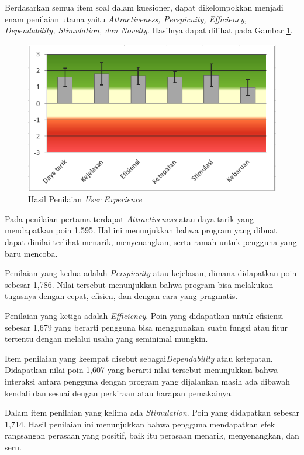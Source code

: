 Berdasarkan semua item soal dalam kuesioner, dapat dikelompokkan menjadi enam penilaian utama yaitu \emph{Attractiveness, Perspicuity, Efficiency, Dependability, Stimulation, dan Novelty}. Hasilnya dapat dilihat pada Gambar \ref{fig:Hasil Penilaian User Experience}. 

\begin{figure}[!htb]
  \centering
  \includegraphics[scale=1.1]{gambar/pengujian-user-experience/hasil-tiap-penilaian.png}
  \caption{Hasil Penilaian \emph{User Experience}}
  \label{fig:Hasil Penilaian User Experience}
\end{figure}

Pada penilaian pertama terdapat \emph{Attractiveness} atau daya tarik yang mendapatkan poin 1,595. Hal ini menunjukkan bahwa program yang dibuat dapat dinilai terlihat menarik, menyenangkan, serta ramah untuk pengguna yang baru mencoba.

Penilaian yang kedua adalah \emph{Perspicuity} atau kejelasan, dimana didapatkan poin sebesar 1,786. Nilai tersebut menunjukkan bahwa program bisa melakukan tugasnya dengan cepat, efisien, dan dengan cara yang pragmatis.

Penilaian yang ketiga adalah \emph{Efficiency}. Poin yang didapatkan untuk efisiensi sebesar 1,679 yang berarti pengguna bisa menggunakan suatu fungsi atau fitur tertentu dengan melalui usaha yang seminimal mungkin.

Item penilaian yang keempat disebut sebagai\emph{Dependability} atau ketepatan. Didapatkan nilai poin 1,607 yang berarti nilai tersebut menunjukkan bahwa interaksi antara pengguna dengan program yang dijalankan masih ada dibawah kendali dan sesuai dengan perkiraan atau harapan pemakainya.
  
Dalam item penilaian yang kelima ada \emph{Stimulation}. Poin yang didapatkan sebesar 1,714. Hasil penilaian ini menunjukkan bahwa pengguna mendapatkan efek rangsangan perasaan yang positif, baik itu perasaan menarik, menyenangkan, dan seru.

